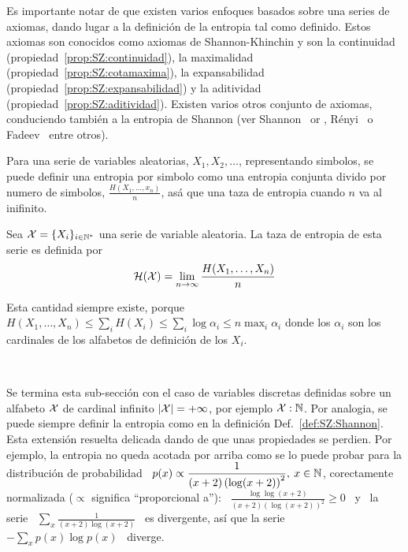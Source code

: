 Es importante notar  de que existen varios enfoques basados  sobre una series de
axiomas, dando lugar  a la definici\'on de la entropia  tal como definido. Estos
axiomas  son conocidos  como axiomas  de Shannon-Khinchin  y son  la continuidad
(propiedad~\ref{prop:SZ:continuidad}),               la              maximalidad
(propiedad~\ref{prop:SZ:cotamaxima}),              la             expansabilidad
(propiedad~\ref{prop:SZ:expansabilidad})         y         la         aditividad
(propiedad~\ref{prop:SZ:aditividad}).  Existen varios otros conjunto de axiomas,
conduciendo tambi\'en a la entropia de Shannon (ver Shannon~\cite[Sec.~6]{Sha48}
or  \cite{ShaWea64},  R\'enyi~\cite{Ren61}  o Fadeev~\cite{Fad56,  Fad58}  entre
otros).

Para  una  serie de  variables  aleatorias,  $X_1,  X_2, \ldots$,  representando
simbolos, se puede  definir una entropia por simbolo  como una entropia conjunta
divido por numero de simbolos, $\frac{H(X_1,\ldots,x_n)}{n}$, as\'a que una taza
de entropia cuando $n$ va al inifinito.
%
\begin{definicion}\label{def:SZ:TazaDeEntropia}
  Sea $\mathcal{X} = \{  X_i \}_{i \in \mathbb{N}^*}$ una  serie de variable aleatoria.  La taza de
  entropia de esta serie es definida por
  \[
  \mathcal{H}(\mathcal{X}) = \lim_{n \to \infty} \frac{H(X_1,\ldots,X_n)}{n}
  \]
\end{definicion}
%
\noindent Esta cantidad siempre existe, porque $H(X_1 , \ldots , X_n) \le \sum_i
H(X_i) \le \sum_i \log \alpha_i \le  n \max_i \alpha_i$ donde los $\alpha_i$ son
los cardinales de los alfabetos de definici\'on de los $X_i$.

\

Se termina esta sub-secci\'on con el caso de variables discretas definidas sobre
un  alfabeto $\mathcal{X}$ de  cardinal infinito  $|\mathcal{X}| =  + \infty$,  por ejemplo  $\mathcal{X} :
\mathbb{N}$.   Por  analogia,  se  puede  siempre  definir la  entropia  como  en  la
definici\'on Def.~\ref{def:SZ:Shannon}. Esta extensi\'on resuelta delicada dando
de que unas  propiedades se perdien.  Por ejemplo, la  entropia no queda acotada
por arriba  como se  lo puede  probar para la  distribuci\'on de  probabilidad \
$\displaystyle p(x)  \propto \frac{1}{(x+2) \left(  \log (x+2) \right)^2},  \: x
\in \mathbb{N}$, corectamente normalizada ($\propto$ significa ``proporcional a''): \
$\displaystyle \frac{\log \log(x+2)}{(x+2) \left( \log (x+2) \right)^2} \ge 0$ \
y  \  la  serie  \  $\displaystyle  \sum_x  \frac{1}{(x+2)  \log  (x+2)}$  \  es
divergente,  as\'i que  la serie  \ $\displaystyle  - \sum_x  p(x) \log  p(x)$ \
diverge.

